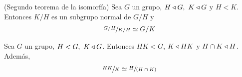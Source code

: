 \begin{thm}(Segundo teorema de la isomorfía)
	Sea $G$ un grupo, $H \mathbin{\triangleleft} G,\ K \mathbin{\triangleleft} G$ y $H < K$. Entonces $K/H$ es un subgrupo normal de $G/H$ y
	\begin{align}
		\sfrac{G/H}{K/H} \simeq G/K
	\end{align}
\end{thm}

\begin{thm}
	Sea $G$ un grupo, $H < G,\ K \mathbin{\triangleleft} G$. Entonces $HK < G$, $K \mathbin{\triangleleft} HK$ y $H\cap K \mathbin{\triangleleft} H$. Además,
	\begin{align}
		\sfrac{HK}{K} \simeq \sfrac{H}{(H \cap K)}
	\end{align}
\end{thm}
